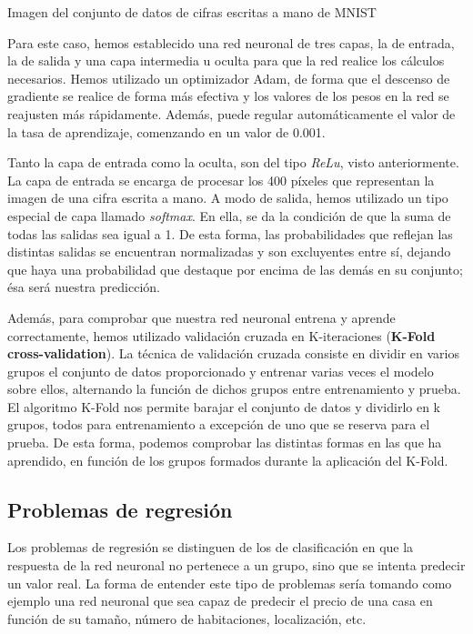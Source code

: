 %
       {Imagen del conjunto de datos de cifras escritas a mano de MNIST \citep{Lecun98gradient-basedlearning}} 

Para este caso, hemos establecido una red neuronal de tres capas, la de entrada, la de salida y una capa intermedia u oculta para que la red realice los cálculos necesarios. Hemos utilizado un optimizador Adam, de forma que el descenso de gradiente se realice de forma más efectiva y los valores de los pesos en la red se reajusten más rápidamente. Además, puede regular automáticamente el valor de la tasa de aprendizaje, comenzando en un valor de 0.001.

Tanto la capa de entrada como la oculta, son del tipo \textit{ReLu}, visto anteriormente. La capa de entrada se encarga de procesar los 400 píxeles que representan la imagen de una cifra escrita a mano. A modo de salida, hemos utilizado un tipo especial de capa llamado \textit{softmax}. En ella, se da la condición de que la suma de todas las salidas sea igual a 1. De esta forma, las probabilidades que reflejan las distintas salidas se encuentran normalizadas y son excluyentes entre sí, dejando que haya una probabilidad que destaque por encima de las demás en su conjunto; ésa será nuestra predicción. 

Además, para comprobar que nuestra red neuronal entrena y aprende correctamente, hemos utilizado validación cruzada en K-iteraciones (\textbf{K-Fold cross-validation}). La técnica de validación cruzada consiste en dividir en varios grupos el conjunto de datos proporcionado y entrenar varias veces el modelo sobre ellos, alternando la función de dichos grupos entre entrenamiento y prueba. El algoritmo K-Fold nos permite barajar el conjunto de datos y dividirlo en k grupos, todos para entrenamiento a excepción de uno que se reserva para el prueba. De esta forma, podemos comprobar las distintas formas en las que ha aprendido, en función de los grupos formados durante la aplicación del K-Fold.

\subsection{Problemas de regresión}
\label{sec:regres_NN}
Los problemas de regresión se distinguen de los de clasificación en que la respuesta de la red neuronal no pertenece a un grupo, sino que se intenta predecir un valor real. La forma de entender este tipo de problemas sería tomando como ejemplo una red neuronal que sea capaz de predecir el precio de una casa en función de su tamaño, número de habitaciones, localización, etc.

